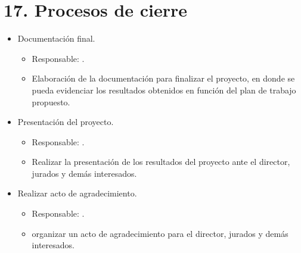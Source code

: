 \documentclass[11pt]{charter}
\begin{document}
\section*{17. Procesos de cierre}    
\label{sec:cierre}

\begin{itemize}

\item Documentación final. 

\begin{itemize}
\item Responsable: \authorname. 
\item Elaboración de la documentación para finalizar el proyecto, en donde se pueda evidenciar los resultados obtenidos en función del plan de trabajo propuesto.  
\end{itemize}

\item Presentación del proyecto. 

\begin{itemize}
\item Responsable: \authorname. 
\item Realizar la presentación de los resultados del proyecto ante el director, jurados y demás interesados.
\end{itemize}

\item Realizar acto de agradecimiento.

\begin{itemize}
\item Responsable: \authorname. 
\item organizar un acto de agradecimiento para el director, jurados y demás interesados.
\end{itemize}

\end{itemize}
\end{document}
